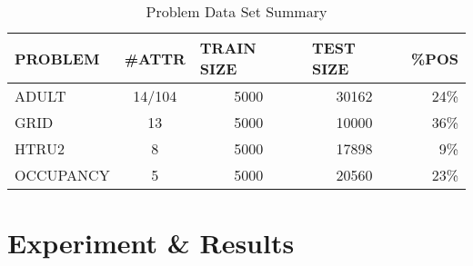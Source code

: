 \documentclass[twoside,11pt]{article}
\begin{document}
    \begin{table}[H]
    \centering
    \caption{\label{tab:Table 1.} Problem Data Set Summary}
    \begin{tabular}{|lcccr|}
    \hline
    PROBLEM   & \multicolumn{1}{l}{\#ATTR} & \multicolumn{1}{l}{TRAIN SIZE} & \multicolumn{1}{l}{TEST SIZE} & \multicolumn{1}{l|}{\%POS} \\ \hline
    ADULT     & 14/104                     & 5000                           & 30162                         & 24\%                       \\
    GRID      & 13                         & 5000                           & 10000                         & 36\%                       \\
    HTRU2     & 8                          & 5000                           & 17898                         & 9\%                        \\
    OCCUPANCY & 5                          & 5000                           & 20560                         & 23\%                       \\ \hline
    \end{tabular}
    \end{table}

\section{Experiment \& Results}
\end{document}
